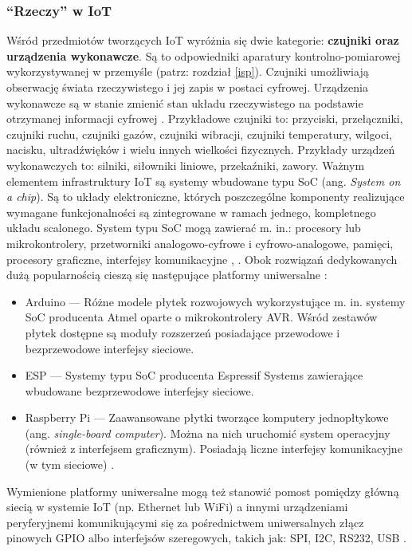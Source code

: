 \documentclass[a4paper, 12pt, twoside]{article}
\begin{document}
\subsubsection{``Rzeczy'' w IoT}

Wśród przedmiotów tworzących IoT wyróżnia się dwie kategorie: 
\textbf{czujniki oraz urządzenia wykonawcze}. Są to odpowiedniki aparatury kontrolno-pomiarowej 
wykorzystywanej w przemyśle (patrz: rozdział \ref{isp}). Czujniki umożliwiają
obserwację świata rzeczywistego i jej zapis w postaci cyfrowej.  
Urządzenia wykonawcze są w stanie zmienić stan układu rzeczywistego
na podstawie otrzymanej informacji cyfrowej \cite{iot-hype-to-reality}.
Przykładowe czujniki to: przyciski, przełączniki, czujniki ruchu, czujniki gazów,
czujniki wibracji, czujniki temperatury, wilgoci,
nacisku, ultradźwięków i wielu innych wielkości fizycznych. Przykłady urządzeń
wykonawczych to: silniki, siłowniki liniowe, przekaźniki, zawory. Ważnym elementem
infrastruktury IoT są systemy wbudowane typu SoC (ang. \emph{System on a chip}).  
Są to układy elektroniczne, których poszczególne komponenty realizujące wymagane 
funkcjonalności są zintegrowane w ramach jednego, kompletnego układu scalonego. 
System typu SoC mogą zawierać m. in.: procesory lub mikrokontrolery, przetworniki
analogowo-cyfrowe i cyfrowo-analogowe, pamięci, procesory graficzne, interfejsy komunikacyjne \cite{intro-to-iot}, \cite{soc}. 
Obok rozwiązań dedykowanych dużą popularnością cieszą się następujące platformy uniwersalne \cite{intro-to-iot}:
\begin{itemize}
    \itemsep0em 
    \item Arduino --- Różne modele płytek rozwojowych wykorzystujące m. in. systemy
    SoC producenta Atmel oparte o mikrokontrolery AVR. Wśród zestawów płytek
    dostępne są moduły rozszerzeń posiadające przewodowe i bezprzewodowe interfejsy sieciowe.
    \item ESP --- Systemy typu SoC producenta Espressif Systems zawierające wbudowane
    bezprzewodowe interfejsy sieciowe.
    \item Raspberry Pi --- Zaawansowane płytki tworzące komputery jednopłtykowe (ang. \emph{single-board computer}).    
    Można na nich uruchomić system operacyjny (również z interfejsem graficznym). Posiadają liczne 
    interfejsy komunikacyjne (w tym sieciowe) \cite{rpi}. 
\end{itemize}
Wymienione platformy uniwersalne mogą też stanowić pomost pomiędzy główną siecią w systemie
IoT (np. Ethernet lub WiFi) a innymi urządzeniami
peryferyjnemi komunikującymi się za pośrednictwem 
uniwersalnych złącz pinowych GPIO albo interfejsów szeregowych, takich jak: SPI, I2C, RS232, USB \cite{intro-to-iot}.
\end{document}
